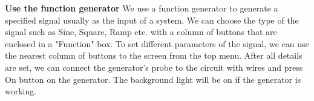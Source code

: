 \textbf{Use the function generator} \newline
\phantom{ } We use a function generator to generate a specified signal usually as the input of a system. We can choose the type of the signal such as Sine, Square, Ramp etc. with a column of buttons that are enclosed in a "Function" box. To set different parameters of the signal, we can use the nearest column of buttons to the screen from the top menu. After all details are set, we can connect the generator's probe to the circuit with wires and press On button on the generator. The background light will be on if the generator is working.\\